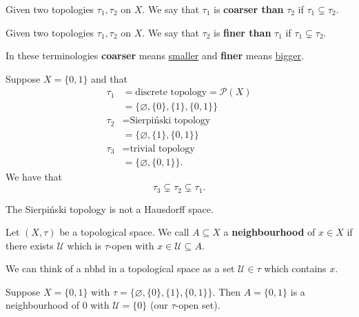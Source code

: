 \documentclass[12pt, a4paper]{article}
\begin{document}
\begin{definition}
    Given two topologies \(\tau_1,\tau_2\) on \(X\). We say that \(\tau_1\) is \textbf{coarser than} \(\tau_2\) if \(\tau_1 \subsetneq \tau_2\).
\end{definition}

\begin{definition}
    Given two topologies \(\tau_1,\tau_2\) on \(X\). We say that \(\tau_2\) is \textbf{finer than} \(\tau_1\) if \(\tau_1 \subsetneq \tau_2\).
\end{definition}

\begin{mdnote}
    In these terminologies \textbf{coarser} means \underline{smaller} and \textbf{finer} means \underline{bigger}.
\end{mdnote}

\begin{mdexample}
    Suppose \(X = \{0,1\}\) and that 
    \[\begin{aligned}
        \tau_1 &= \text{discrete topology} = \mathcal{P}(X) \\
        &=\{\varnothing, \{0\}, \{1\}, \{0,1\} \} \\
        \tau _2 &= \text{Sierpiński topology}  \\
        &= \{ \varnothing, \{1\}, \{0,1\} \} \\
        \tau_3 &= \text{trivial topology} \\
        &= \{\varnothing, \{0,1\} \}.
    \end{aligned}\]
    We have that 
    \[\tau_3 \subsetneq \tau_2 \subsetneq \tau_1.\]
\end{mdexample}

\begin{mdremark}
    The Sierpiński topology is not a Hausdorff space.
\end{mdremark}

\begin{definition}
    Let \((X,\tau)\) be a topological space. We call \(A \subseteq X\) a \textbf{neighbourhood} of \(x \in X\) if there exists \(\mathcal{U}\) which is \(\tau\)-open with \(x \in \mathcal{U} \subseteq A\).
\end{definition}

\begin{mdnote}
    We can think of a nbhd in a topological space as a set \(\mathcal{U} \in \tau\) which contains \(x\).
\end{mdnote}

\begin{example}
    Suppose \(X = \{0,1\}\) with \(\tau = \{\varnothing, \{0\}, \{1\}, \{0,1\} \}\). Then \(A = \{0,1\}\) is a neighbourhood of \(0\) with \(\mathcal{U} = \{0\}\) (our \(\tau\)-open set).
\end{example}
\end{document}

